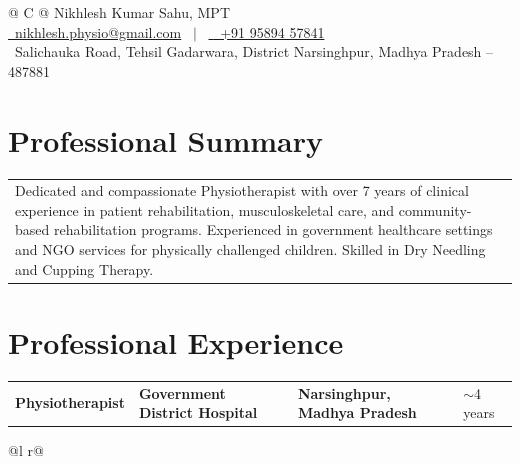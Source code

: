 \documentclass[a4paper,10pt]{article}
\newcommand{\customHeading}[1]{
    \section{\texorpdfstring{#1 \hrulefill}{}}
}
\newcommand{\customSubHeading}[4]{
    \begin{tabularx}{1.0\textwidth} {
           >{\raggedright\arraybackslash}X
           >{\raggedleft\arraybackslash}X
           >{\raggedleft\arraybackslash}X
           >{\raggedleft\arraybackslash}X  }
          \textbf{#1} &\textbf{#2} & \textbf{#3} & #4 \\[2.0pt]
    \end{tabularx}
}
\begin{document}
\pagestyle{empty}


\begin{tabularx}{\linewidth}{@{} C @{}}
\Huge{Nikhlesh Kumar Sahu, MPT} \\[7.5pt]


\href{mailto:nikhlesh.physio@gmail.com}{\raisebox{-0.05\height}
{\textnormal{\textcolor{yt}{\faEnvelope}}}
\ nikhlesh.physio@gmail.com}
\ $|$ \
\href{tel:+919589457841}{\raisebox{-0.05\height}
{\textnormal{\textcolor{gray}{\faMobile}}}
\ +91 95894 57841}
\\[3.0pt]
{\raisebox{-0.05\height}
{\textnormal{\textcolor{gray}{\faMapMarker}}}
\ Salichauka Road, Tehsil Gadarwara, District Narsinghpur, Madhya Pradesh -- 487881}
\end{tabularx}



\customHeading{Professional Summary}
\begin{tabularx}{\linewidth}{ @{}X@{} }
Dedicated and compassionate Physiotherapist with over 7 years of clinical experience in patient rehabilitation, musculoskeletal care, and community-based rehabilitation programs. Experienced in government healthcare settings and NGO services for physically challenged children. Skilled in Dry Needling and Cupping Therapy.
\end{tabularx}



\customHeading{Professional Experience}
\customSubHeading{Physiotherapist}
{Government District Hospital}
{Narsinghpur, Madhya Pradesh}{$\sim$4 years}
\begin{tabularx}{\linewidth}{ @{}l r@{} }
\end{tabularx}
\end{document}
